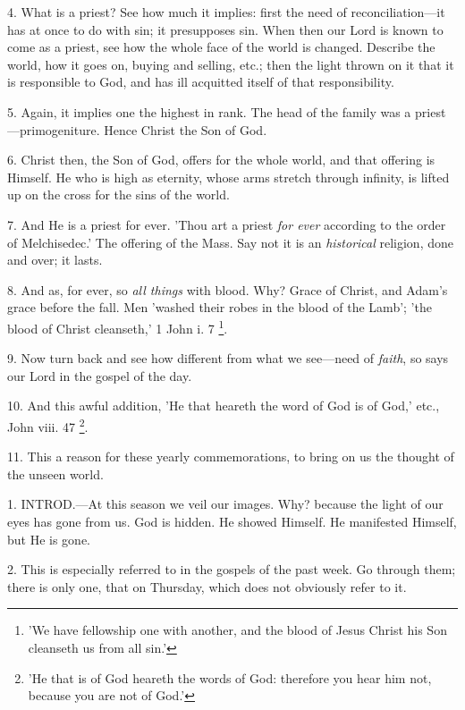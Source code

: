 4. What is a priest? See how much it implies:
first the need of reconciliation—it has at once to do with sin;
it presupposes sin. When then our Lord is known to come as a priest,
see how the whole face of the world is changed. Describe the world,
how it goes on, buying and selling, etc.; then the light thrown on it
that it is responsible to God, and has ill acquitted itself of that
responsibility.

5. Again, it implies one the highest in rank. The
head of the family was a priest—primogeniture. Hence Christ the Son
of God.

6. Christ then, the Son of God, offers for the
whole world, and that offering is Himself. He who is high as eternity,
whose arms stretch through infinity, is lifted up on the cross for the
sins of the world.

7. And He is a priest for ever. 'Thou art a
priest \emph{for ever} according to the order of Melchisedec.' The
offering of the Mass. Say not it is an \emph{historical} religion,
done and over; it lasts.

8. And as, for ever, so \emph{all things} with
blood. Why? Grace of Christ, and Adam's grace before the fall. Men
'washed their robes in the blood of the Lamb'; 'the blood of Christ
cleanseth,' 1 John i. 7 \footnote{'We have fellowship one
with another, and the blood of Jesus Christ his Son cleanseth us from
all sin.'}.

9. Now turn back and see how different from what
we see—need of \emph{faith}, so says our Lord in the gospel of the
day.

10. And this awful addition, 'He that heareth the
word of God is of God,' etc., John viii. 47 \footnote{'He that is of God
heareth the words of God: therefore you hear him not, because you are
not of God.'}.

11. This a reason for these yearly
commemorations, to bring on us the thought of the unseen world.


1. INTROD.—At
this season we veil our images. Why? because the light of our eyes has
gone from us. God is hidden. He showed Himself. He manifested Himself,
but He is gone.

2. This is especially referred to in the gospels
of the past week. Go through them; there is only one, that on
Thursday, which does not obviously refer to it.

